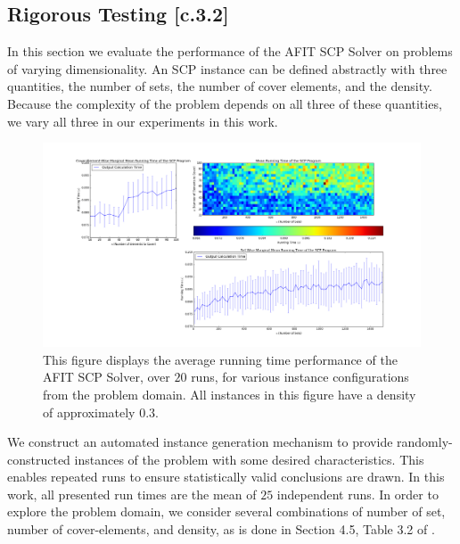 \documentclass[12pt]{article}
\begin{document}
\subsection{Rigorous Testing [c.3.2]} \label{scn:testing_complete}

In this section we evaluate the performance of the AFIT SCP Solver on problems of varying dimensionality. An SCP instance can be defined abstractly with three quantities, the number of sets, the number of cover elements, and the density. Because the complexity of the problem depends on all three of these quantities, we vary all three in our experiments in this work. 

\begin{figure}[ht!]\label{fig:runtime_analysis_density0p3}
	
	\centering
	\centerline{\includegraphics[width = 6.7in]{running_time_original_density0p3.png}}
	\hfill
	
	\caption{This figure displays the average running time performance of the AFIT SCP Solver, over $20$ runs, for various instance configurations from the problem domain. All instances in this figure have a density of approximately $0.3$.}
	
\end{figure}


We construct an automated instance generation mechanism to provide randomly-constructed instances of the problem with some desired characteristics. This enables repeated runs to ensure statistically valid conclusions are drawn. In this work, all presented run times are the mean of $25$ independent runs. In order to explore the problem domain, we consider several combinations of number of set, number of cover-elements, and density, as is done in Section 4.5, Table 3.2 of \cite{graph_algorithms_cristofides}.
\end{document}
